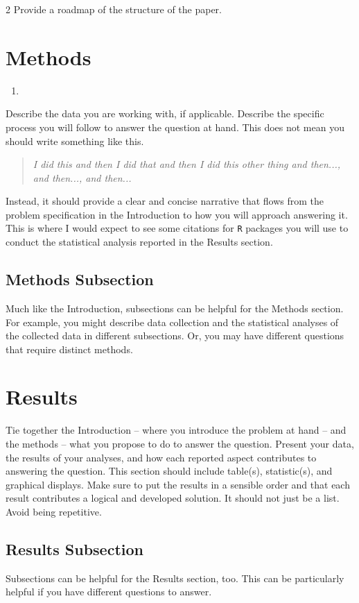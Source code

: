 \documentclass{article}\usepackage[]{graphicx}\usepackage[]{xcolor}
\begin{document}
\begin{multicols}{2}
Provide a roadmap of the structure of the paper. 



\section{Methods}

\begin{enumerate}
  \item 
\end{enumerate}

Describe the data you are working with, if applicable. Describe the specific process you will follow to answer the question at hand. This does not mean you should write something like this.
\begin{quote}
\textit{I did this and then I did that and then I did this other thing and then..., and then..., and then...}
\end{quote}
Instead, it should provide a clear and concise narrative that flows from the problem specification in the Introduction to how you will approach answering it. This is where I would expect to see some citations for \texttt{R} packages you will use to conduct the statistical analysis reported in the Results section.


\subsection{Methods Subsection}
Much like the Introduction, subsections can be helpful for the Methods section. For example, you might describe data collection and the statistical analyses of the collected data in different subsections. Or, you may have different questions that require distinct methods. 

\section{Results}
Tie together the Introduction -- where you introduce the problem at hand -- and the methods --  what you propose to do to answer the question. Present your data, the results of your analyses, and how each reported aspect contributes to answering the question. This section should include table(s), statistic(s), and graphical displays. Make sure to put the results in a sensible order and that each result contributes a logical and developed solution. It should not just be a list. Avoid being repetitive. 

\subsection{Results Subsection}
Subsections can be helpful for the Results section, too. This can be particularly helpful if you have different questions to answer. 



\end{multicols}
\end{document}
